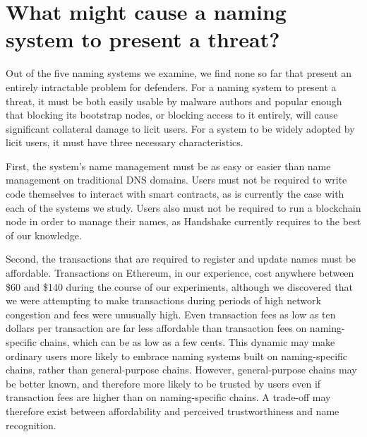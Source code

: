 \documentclass[10pt,sigconf,letterpaper]{acmart}
\begin{document}
\section{What might cause a naming system to present a threat?}

Out of the five naming systems we examine, we find none so far that present an 
entirely intractable problem for defenders. For a naming system to present a  
threat, it must be both easily usable by malware authors and 
popular enough that blocking its bootstrap nodes, or blocking 
access to it entirely, will cause significant collateral damage to licit users.
For a system to be widely adopted by licit users, it must have three necessary characteristics. 

First, the system's name management must be as 
easy or easier than name management on traditional DNS domains. Users must not be required to write 
code themselves to interact with smart contracts, as is currently the case with each of the systems we 
study. Users also must not be required to run a blockchain node in order to manage their names, as 
Handshake currently requires to the best of our knowledge.

Second, the transactions that are required to register and update names must be affordable. 
Transactions on Ethereum, in our experience, cost anywhere between \$60 and \$140 during the course of 
our experiments, although we discovered that we were attempting to make transactions during periods of 
high network congestion and fees were unusually high. Even transaction fees as low as ten dollars per 
transaction are far less affordable than transaction fees on naming-specific chains, which can be as 
low as a few cents. This dynamic may make ordinary users more likely to embrace naming systems built 
on naming-specific chains, rather than general-purpose chains. However, general-purpose chains may be 
better known, and therefore more likely to be trusted by users even if transaction fees are higher 
than on naming-specific chains. A trade-off may therefore exist between affordability and perceived 
trustworthiness and name recognition. 
\end{document}
